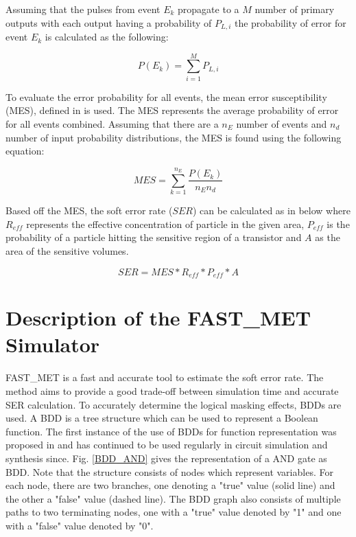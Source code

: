 Assuming that the pulses from event $E_k$ propagate to a $M$ number of primary outputs with each output having a probability of $P_{L,i}$ the probability of error for event $E_k$ is calculated as the following:  

\begin{equation} \label{event_eq}
P(E_k) = \sum_{i=1}^{M} P_{L,i}
\end{equation}

To evaluate the error probability for all events, the mean error susceptibility (MES), defined in \cite{METSys} is used. The MES represents the average probability of error for all events combined. Assuming that there are a $n_E$ number of events and $n_d$ number of input probability distributions, the MES is found using the following equation:

\begin{equation} \label{MES}
MES = \sum_{k=1}^{n_E} \frac{P(E_k)}{n_E n_d}
\end{equation}

Based off the MES, the soft error rate ($SER$) can be calculated as in below where $R_{eff}$ represents the effective concentration of particle in the given area, $P_{eff}$ is the probability of a particle hitting the sensitive region of a transistor and $A$ as the area of the sensitive volumes.

\begin{equation} \label{SER}
SER = MES*R_{eff}*P_{eff}*A 
\end{equation}

\section{Description of the FAST\_MET Simulator} \label{ch3:desc}

FAST\_MET is a fast and accurate tool to estimate the soft error rate. The method aims to provide a good trade-off between simulation time and accurate SER calculation. To accurately determine the logical masking effects, BDDs are used. A BDD is a tree structure which can be used to represent a Boolean function. The first instance of the use of BDDs for function representation was proposed in \cite{Bryant1986} and has continued to be used regularly in circuit simulation and synthesis since. Fig. \ref{BDD_AND} gives the representation of a AND gate as BDD. Note that the structure consists of nodes which represent variables. For each node, there are two branches, one denoting a "true" value (solid line) and the other a "false" value (dashed line). The BDD graph also consists of multiple paths to two terminating nodes, one with a "true" value denoted by "1" and one with a "false" value denoted by "0".


